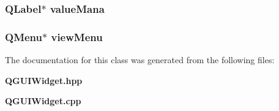 \subsubsection{\setlength{\rightskip}{0pt plus 5cm}QLabel$\ast$ {\bf value\-Mana}\hspace{0.3cm}{\tt  [protected]}}\label{classQGUIWidget_p1}


\subsubsection{\setlength{\rightskip}{0pt plus 5cm}QMenu$\ast$ {\bf view\-Menu}\hspace{0.3cm}{\tt  [protected]}}\label{classQGUIWidget_p11}




The documentation for this class was generated from the following files:\begin{CompactItemize}
\item 
{\bf QGUIWidget.hpp}\item 
{\bf QGUIWidget.cpp}\end{CompactItemize}
